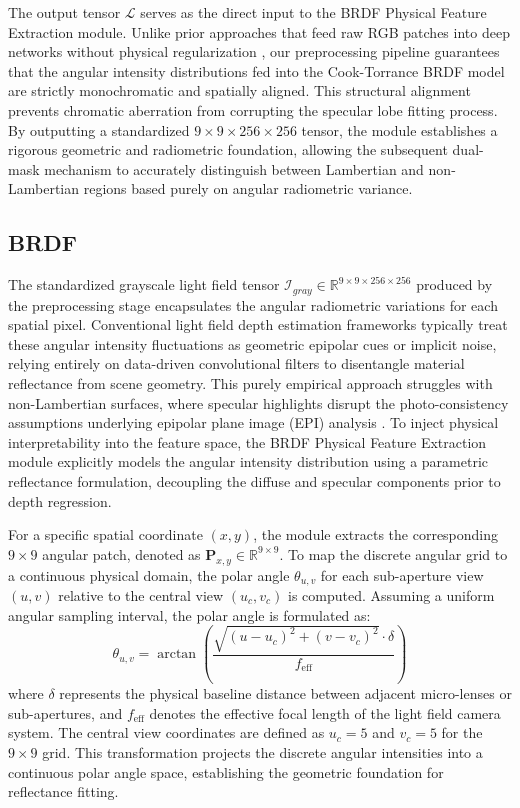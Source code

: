 \documentclass[lettersize,journal]{IEEEtran}
\begin{document}
The output tensor $\mathcal{L}$ serves as the direct input to the BRDF Physical Feature Extraction module. Unlike prior approaches that feed raw RGB patches into deep networks without physical regularization \cite{peng2022}, our preprocessing pipeline guarantees that the angular intensity distributions fed into the Cook-Torrance BRDF model are strictly monochromatic and spatially aligned. This structural alignment prevents chromatic aberration from corrupting the specular lobe fitting process. By outputting a standardized $9 \times 9 \times 256 \times 256$ tensor, the module establishes a rigorous geometric and radiometric foundation, allowing the subsequent dual-mask mechanism to accurately distinguish between Lambertian and non-Lambertian regions based purely on angular radiometric variance.

\subsection{BRDF}

The standardized grayscale light field tensor $\mathcal{I}_{gray} \in \mathbb{R}^{9 \times 9 \times 256 \times 256}$ produced by the preprocessing stage encapsulates the angular radiometric variations for each spatial pixel. Conventional light field depth estimation frameworks \cite{heber2018, lyu2022} typically treat these angular intensity fluctuations as geometric epipolar cues or implicit noise, relying entirely on data-driven convolutional filters to disentangle material reflectance from scene geometry. This purely empirical approach struggles with non-Lambertian surfaces, where specular highlights disrupt the photo-consistency assumptions underlying epipolar plane image (EPI) analysis \cite{wanner2014}. To inject physical interpretability into the feature space, the BRDF Physical Feature Extraction module explicitly models the angular intensity distribution using a parametric reflectance formulation, decoupling the diffuse and specular components prior to depth regression.

For a specific spatial coordinate $(x, y)$, the module extracts the corresponding $9 \times 9$ angular patch, denoted as $\mathbf{P}_{x,y} \in \mathbb{R}^{9 \times 9}$. To map the discrete angular grid to a continuous physical domain, the polar angle $\theta_{u,v}$ for each sub-aperture view $(u, v)$ relative to the central view $(u_c, v_c)$ is computed. Assuming a uniform angular sampling interval, the polar angle is formulated as:
\begin{equation}
\theta_{u,v} = \arctan\left( \frac{\sqrt{(u - u_c)^2 + (v - v_c)^2} \cdot \delta}{f_{\text{eff}}} \right)
\end{equation}
where $\delta$ represents the physical baseline distance between adjacent micro-lenses or sub-apertures, and $f_{\text{eff}}$ denotes the effective focal length of the light field camera system. The central view coordinates are defined as $u_c = 5$ and $v_c = 5$ for the $9 \times 9$ grid. This transformation projects the discrete angular intensities into a continuous polar angle space, establishing the geometric foundation for reflectance fitting.
\end{document}
